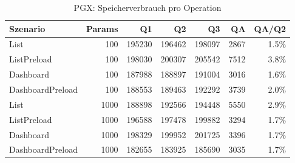 \begin{table}[ht]
\centering
\caption{PGX: Speicherverbrauch pro Operation}
\begin{tabular}{lrrrrrr}
\toprule
Szenario & Params & Q1 & Q2 & Q3 & QA & QA/Q2 \\
\midrule
		List & 100 & 195230 & 196462 & 198097 & 2867 & 1.5\% \\
		ListPreload & 100 & 198030 & 200307 & 205542 & 7512 & 3.8\% \\
		Dashboard & 100 & 187988 & 188897 & 191004 & 3016 & 1.6\% \\
		DashboardPreload & 100 & 188553 & 189463 & 192292 & 3739 & 2.0\% \\
		List & 1000 & 188898 & 192566 & 194448 & 5550 & 2.9\% \\
		ListPreload & 1000 & 196588 & 197478 & 199882 & 3294 & 1.7\% \\
		Dashboard & 1000 & 198329 & 199952 & 201725 & 3396 & 1.7\% \\
		DashboardPreload & 1000 & 182655 & 183925 & 185690 & 3035 & 1.7\% \\
\bottomrule
\end{tabular}
\label{tab:benchmark_pgx_bytesperop}
\end{table}
	